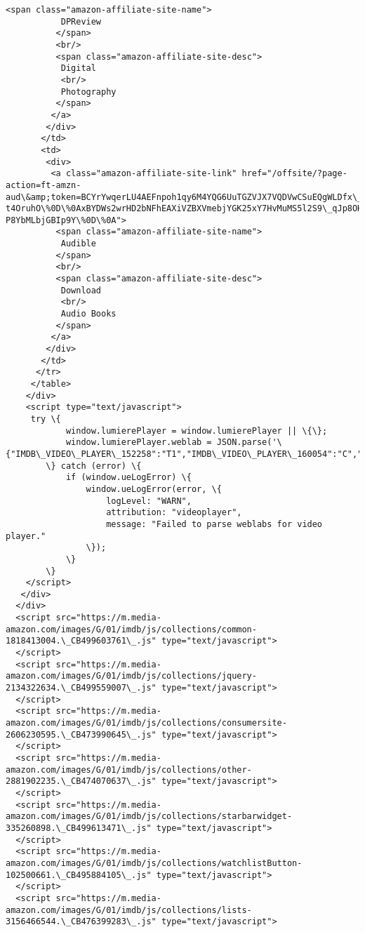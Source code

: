 \documentclass[11pt]{article}
\begin{document}
\begin{Verbatim}[commandchars=\\\{\}]
          <span class="amazon-affiliate-site-name">
           DPReview
          </span>
          <br/>
          <span class="amazon-affiliate-site-desc">
           Digital
           <br/>
           Photography
          </span>
         </a>
        </div>
       </td>
       <td>
        <div>
         <a class="amazon-affiliate-site-link" href="/offsite/?page-action=ft-amzn-aud\&amp;token=BCYrYwqerLU4AEFnpoh1qy6M4YQG6UuTGZVJX7VQDVwCSuEQgWLDfx\_jwenJ2aRL9CjC-t4OruhO\%0D\%0AxBYDWs2wrHD2bNFhEAXiVZBXVmebjYGK25xY7HvMuMS5l2S9\_qJp8OH528rCGTffiZocRNjxWW43\%0D\%0Ac1UxBfS6-P8YbMLbjGBIp9Y\%0D\%0A">
          <span class="amazon-affiliate-site-name">
           Audible
          </span>
          <br/>
          <span class="amazon-affiliate-site-desc">
           Download
           <br/>
           Audio Books
          </span>
         </a>
        </div>
       </td>
      </tr>
     </table>
    </div>
    <script type="text/javascript">
     try \{
            window.lumierePlayer = window.lumierePlayer || \{\};
            window.lumierePlayer.weblab = JSON.parse('\{"IMDB\_VIDEO\_PLAYER\_152258":"T1","IMDB\_VIDEO\_PLAYER\_160054":"C","IMDB\_VIDEO\_PLAYER\_152651":"T1","IMDB\_VIDEO\_PLAYER\_156650":"T1"\}');
        \} catch (error) \{
            if (window.ueLogError) \{
                window.ueLogError(error, \{
                    logLevel: "WARN",
                    attribution: "videoplayer",
                    message: "Failed to parse weblabs for video player."
                \});
            \}
        \}
    </script>
   </div>
  </div>
  <script src="https://m.media-amazon.com/images/G/01/imdb/js/collections/common-1818413004.\_CB499603761\_.js" type="text/javascript">
  </script>
  <script src="https://m.media-amazon.com/images/G/01/imdb/js/collections/jquery-2134322634.\_CB499559007\_.js" type="text/javascript">
  </script>
  <script src="https://m.media-amazon.com/images/G/01/imdb/js/collections/consumersite-2606230595.\_CB473990645\_.js" type="text/javascript">
  </script>
  <script src="https://m.media-amazon.com/images/G/01/imdb/js/collections/other-2881902235.\_CB474070637\_.js" type="text/javascript">
  </script>
  <script src="https://m.media-amazon.com/images/G/01/imdb/js/collections/starbarwidget-335260898.\_CB499613471\_.js" type="text/javascript">
  </script>
  <script src="https://m.media-amazon.com/images/G/01/imdb/js/collections/watchlistButton-102500661.\_CB495884105\_.js" type="text/javascript">
  </script>
  <script src="https://m.media-amazon.com/images/G/01/imdb/js/collections/lists-3156466544.\_CB476399283\_.js" type="text/javascript">

\end{Verbatim}
\end{document}
